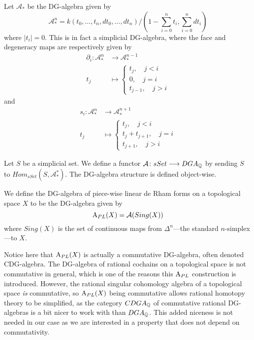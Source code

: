 \begin{definition}
Let $\mathcal{A}_*$ be the DG-algebra given by 
\begin{equation*}
    \mathcal{A}^n_* = k(t_0, \ldots, t_n, dt_0, \ldots, dt_n)/(1-\sum_{i=0}^n t_i, \sum_{i=0}^n dt_i) 
\end{equation*}
where $|t_i|=0$. This is in fact a simplicial DG-algebra, where the face and degeneracy maps are respectively given by 
\begin{align*}
    \partial_i\colon \mathcal{A}_*^n &\longrightarrow\mathcal{A}_*^{n-1} \\
    t_j&\longmapsto
    \begin{cases}
        t_j, \quad j<i \\
        0, \quad j=i \\
        t_{j-1}, \quad j>i
    \end{cases}
\end{align*}
and 
\begin{align*}
    s_i\colon \mathcal{A}_*^n &\longrightarrow\mathcal{A}_*^{n+1} \\
    t_j&\longmapsto
    \begin{cases}
        t_j, \quad j<i \\
        t_j+t_{j+1}, \quad j=i \\
        t_{j+1}, \quad j>i
    \end{cases}
\end{align*}
\end{definition}

\begin{definition}
Let $S$ be a simplicial set. We define a functor $\mathcal{A}\colon sSet\longrightarrow DGA_{\mathbb{Q}}$ by sending $S$ to $Hom_{sSet}(S, \mathcal{A}_*^*)$. The DG-algebra structure is defined object-wise.
\end{definition}


\begin{example}
We define the DG-algebra of piece-wise linear de Rham forms on a topological space $X$ to be the DG-algebra given by
\begin{equation*}
    \text{A}_{PL}(X) = \mathcal{A}(Sing(X))
\end{equation*}
where $Sing(X)$ is the set of continuous maps from $\Delta^n$---the standard $n$-simplex---to $X$. 
\end{example}

Notice here that $\text{A}_{PL}(X)$ is actually a commutative DG-algebra, often denoted CDG-algebra. The DG-algebra of rational cochains on a topological space is not commutative in general, which is one of the reasons this $\text{A}_{PL}$ construction is introduced. However, the rational singular cohomology algebra of a topological space \emph{is} commutative, so $\text{A}_{PL}(X)$ being commutative allows rational homotopy theory to be simplified, as the category $CDGA_{\mathbb{Q}}$ of commutative rational DG-algebras is a bit nicer to work with than $DGA_{\mathbb{Q}}$. This added niceness is not needed in our case as we are interested in a property that does not depend on commutativity.  





